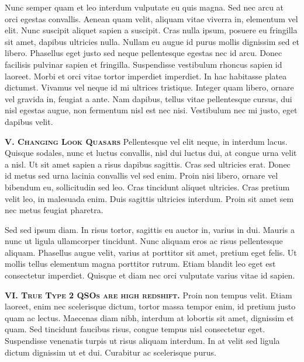 \documentclass[11pt,epsf]{article}
\begin{document}
\noindent
Nunc semper quam et leo interdum vulputate eu quis magna. Sed nec arcu
at orci egestas convallis. Aenean quam velit, aliquam vitae viverra
in, elementum vel elit. Nunc suscipit aliquet sapien a suscipit. Cras
nulla ipsum, posuere eu fringilla sit amet, dapibus ultricies
nulla. Nullam eu augue id purus mollis dignissim sed et
libero. Phasellus eget justo sed neque pellentesque egestas nec id
arcu. Donec facilisis pulvinar sapien et fringilla. Suspendisse
vestibulum rhoncus sapien id laoreet. Morbi et orci vitae tortor
imperdiet imperdiet. In hac habitasse platea dictumst. Vivamus vel
neque id mi ultrices tristique. Integer quam libero, ornare vel
gravida in, feugiat a ante. Nam dapibus, tellus vitae pellentesque
cursus, dui nisl egestas augue, non fermentum nisl est nec
nisi. Vestibulum nec mi justo, eget dapibus velit.


\medskip
\medskip

\smallskip
\smallskip
\noindent
\textbf{\textsc{V. Changing Look Quasars}} 
Pellentesque vel elit neque, in interdum lacus. Quisque sodales, nunc
et luctus convallis, nisl dui luctus dui, at congue urna velit a
nisl. Ut sit amet sapien a risus dapibus sagittis. Cras sed ultricies
erat. Donec id metus sed urna lacinia convallis vel sed enim. Proin
nisi libero, ornare vel bibendum eu, sollicitudin sed leo. Cras
tincidunt aliquet ultricies. Cras pretium velit leo, in malesuada
enim. Duis sagittis ultricies interdum. Proin sit amet sem nec metus
feugiat pharetra.

\noindent
Sed sed ipsum diam. In risus tortor, sagittis eu auctor in, varius in
dui. Mauris a nunc ut ligula ullamcorper tincidunt. Nunc aliquam eros
ac risus pellentesque aliquam. Phasellus augue velit, varius at
porttitor sit amet, pretium eget felis. Ut mollis tellus elementum
magna porttitor rutrum. Etiam blandit leo eget est consectetur
imperdiet. Quisque et diam nec orci vulputate varius vitae id sapien.



\medskip
\medskip

\smallskip
\smallskip
\noindent
\textbf{\textsc{VI. True Type 2 QSOs are high redshift.}} 
Proin non tempus velit. Etiam laoreet, enim nec scelerisque dictum,
tortor massa tempor enim, id pretium justo quam ac lectus. Maecenas
diam nibh, interdum at lobortis sit amet, dignissim et quam. Sed
tincidunt faucibus risus, congue tempus nisl consectetur
eget. Suspendisse venenatis turpis ut risus aliquam interdum. In at
velit sed ligula dictum dignissim ut et dui. Curabitur ac scelerisque
purus.
\end{document}
